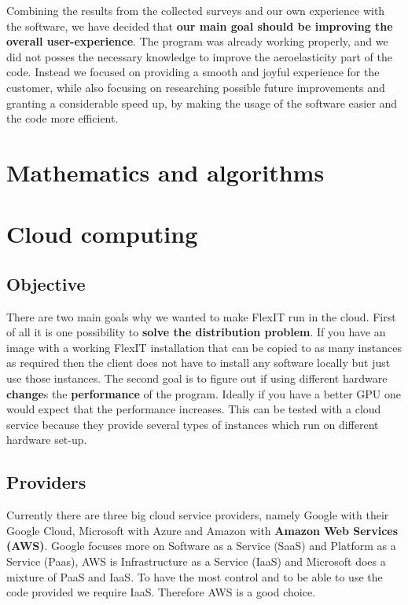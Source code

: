 \documentclass[a4paper, 11pt, article]{report}
\begin{document}
Combining the results from the collected surveys and our own experience with the software, we have decided that \textbf{our main goal should be improving the overall user-experience}. The program was already working properly, and we did not posses the necessary knowledge to improve the aeroelasticity part of the code. Instead we focused on providing a smooth and joyful experience for the customer, while also focusing on researching possible future improvements and granting a considerable speed up, by making the usage of the software easier and the code more efficient.

\section{Mathematics and algorithms}



\section{Cloud computing}


\subsection{Objective}

There are two main goals why we wanted to make FlexIT run in the cloud. First of all it is one possibility to \textbf{solve the distribution problem}. If you have an image with a working FlexIT installation that can be copied to as many instances as required then the client does not have to install any software locally but just use those instances. The second goal is to figure out if using different hardware \textbf{change}s the \textbf{performance} of the program. Ideally if you have a better GPU one would expect that the performance increases. This can be tested with a cloud service because they provide several types of instances which run on different hardware set-up. 

\subsection{Providers}

Currently there are three big cloud service providers, namely Google with their Google Cloud, Microsoft with Azure and Amazon with \textbf{Amazon Web Services (AWS)}. Google focuses more on Software as a Service (SaaS) and Platform as a Service (Paas), AWS is Infrastructure as a Service (IaaS) and Microsoft does a mixture of PaaS and IaaS. To have the most control and to be able to use the code provided we require IaaS. Therefore AWS is a good choice.
\end{document}

